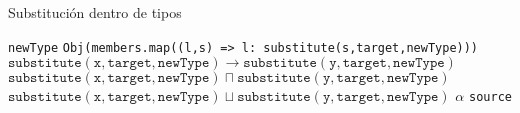 \begin{algorithm}\captionsetup{labelsep=newline}
  \centering
  \caption{Substitución dentro de tipos}
  \label{pseudosubstitute}
    \begin{algorithmic}[1]
            \State \Return \texttt{newType}
          \EndIf
              \State \Return \texttt{Obj(members.map((l,s) => {l: substitute(s,target,newType)}))}
            \EndCase
              \State \Return $\mathtt{substitute(x,target,newType)\rightarrow substitute(y,target,newType)}$
            \EndCase
              \State \Return $\mathtt{substitute(x,target,newType) \sqcap substitute(y,target,newType)}$
            \EndCase
              \State \Return $\mathtt{substitute(x,target,newType) \sqcup substitute(y,target,newType)}$
            \EndCase
            \Case{$\alpha$}
              \State \Return $\alpha$
            \EndCase
          \EndSwitch
      \State \Return \texttt{source}
      \EndFunction
    \end{algorithmic}
\end{algorithm}

